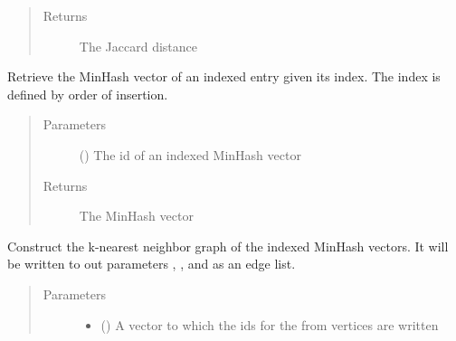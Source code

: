 \documentclass[letterpaper,10pt,english]{sphinxmanual}
\begin{document}
\begin{fulllineitems}
\begin{fulllineitems}
\begin{quote}
\begin{description}
\begin{itemize}
\end{itemize}

\item[{Returns}] \leavevmode
{} The Jaccard distance

\end{description}\end{quote}

\end{fulllineitems}


\begin{fulllineitems}
\label{\detokenize{documentation:tmap.LSHForest.get_hash}}
Retrieve the MinHash vector of an indexed entry given its index. The index is defined by order of insertion.
\begin{quote}\begin{description}
\item[{Parameters}] \leavevmode
{} () \textendash{} The id of an indexed MinHash vector

\item[{Returns}] \leavevmode
{} The MinHash vector

\end{description}\end{quote}

\end{fulllineitems}


\begin{fulllineitems}
\label{\detokenize{documentation:tmap.LSHForest.get_knn_graph}}
Construct the k-nearest neighbor graph of the indexed MinHash vectors. It will be written to out parameters , , and  as an edge list.
\begin{quote}\begin{description}
\item[{Parameters}] \leavevmode\begin{itemize}
\item {} 
 () \textendash{} A vector to which the ids for the from vertices are written


\end{itemize}
\end{description}
\end{quote}
\end{fulllineitems}
\end{fulllineitems}
\end{document}
